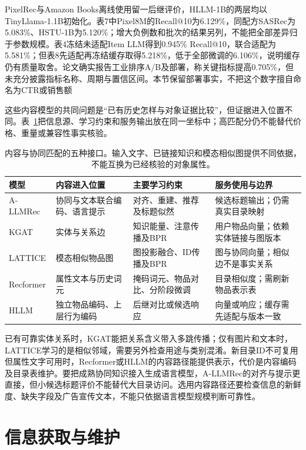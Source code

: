 PixelRec与Amazon Books离线使用留一后继评价，HLLM-1B的两层均以TinyLlama-1.1B初始化。表7中Pixel8M的Recall@10为6.129\%，同配方SASRec为5.083\%、HSTU-1B为5.120\%；增大负例数和批次的结果另列，不能把全部差异归于参数规模。表4冻结未适配Item LLM得到0.945\% Recall@10，联合适配为5.581\%；但表8先适配再冻结缓存取得5.218\%，低于全部微调的6.106\%，说明缓存仍有质量取舍。论文确实报告工业排序A/B及部署，称关键指标提高0.705\%，但未充分披露指标名称、周期与置信区间。本节保留部署事实，不把这个数字擅自命名为CTR或销售额

这些内容模型的共同问题是“已有历史怎样与对象证据比较”，但证据进入位置不同。表~\ref{tab:rs-content-model-tradeoffs}把信息源、学习约束和服务输出放在同一坐标中；高匹配分仍不能替代价格、重量或兼容性事实核验。

\begin{table}[htbp]
  \centering
  \small
  \begin{tabularx}{\linewidth}{@{}lXXX@{}}
    \toprule
    模型 & 内容进入位置 & 主要学习约束 & 服务使用与边界 \\
    \midrule
    A-LLMRec & 协同与文本联合编码、语言提示 & 对齐、重建、推荐及标题似然 & 候选标题输出；仍需真实目录映射 \\
    KGAT & 实体与关系边 & 知识能量、注意传播及BPR & 用户物品向量；依赖实体链接与图版本 \\
    LATTICE & 模态相似物品图 & 图投影融合、ID传播及BPR & 图与协同向量；相似边不是事实关系 \\
    Recformer & 属性文本与历史词元 & 掩码词元、物品对比、分阶段微调 & 目录相似度；需刷新物品表示表 \\
    HLLM & 独立物品编码、上层行为编码 & 后继对比或候选响应 & 向量或响应；缓存需先适配与版本一致 \\
    \bottomrule
  \end{tabularx}
  \caption{内容与协同匹配的五种接口。输入文字、已链接知识和模态相似图提供不同依据，不能互换为已经核验的对象属性。}
  \label{tab:rs-content-model-tradeoffs}
\end{table}

已有可靠实体关系时，KGAT能把关系含义带入多跳传播；仅有图片和文本时，LATTICE学习的是相似邻域，需要另外检查用途与类别混淆。新目录ID不可复用但属性文字可用时，Recformer或HLLM的内容路径能提供表示，代价是内容编码及目录表维护。要把成熟协同知识接入生成语言模型，A-LLMRec的对齐与提示更直接，但小候选标题评价不能替代大目录访问。选用内容路径还要检查信息的新鲜度、缺失字段及广告宣传文本，不能只依据语言模型规模判断可靠性。

\section{信息获取与维护}
\label{sec:rs-evidence-maintenance}

